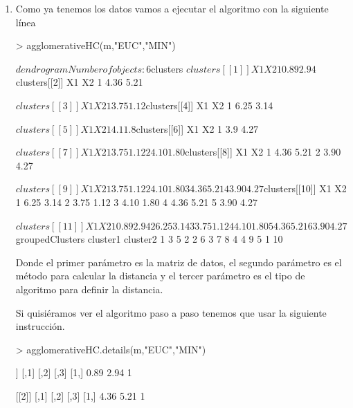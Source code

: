 \documentclass[parskip=full]{scrartcl}
\begin{document}
\begin{enumerate}
    \item Como ya tenemos los datos vamos a ejecutar el algoritmo con la siguiente línea


\begin{Schunk}
\begin{Sinput}
> agglomerativeHC(m,"EUC","MIN")
\end{Sinput}
\begin{Soutput}
$dendrogram
Number of objects: 6 


$clusters
$clusters[[1]]
    X1   X2
1 0.89 2.94

$clusters[[2]]
    X1   X2
1 4.36 5.21

$clusters[[3]]
    X1   X2
1 3.75 1.12

$clusters[[4]]
    X1   X2
1 6.25 3.14

$clusters[[5]]
   X1  X2
1 4.1 1.8

$clusters[[6]]
   X1   X2
1 3.9 4.27

$clusters[[7]]
    X1   X2
1 3.75 1.12
2 4.10 1.80

$clusters[[8]]
    X1   X2
1 4.36 5.21
2 3.90 4.27

$clusters[[9]]
    X1   X2
1 3.75 1.12
2 4.10 1.80
3 4.36 5.21
4 3.90 4.27

$clusters[[10]]
    X1   X2
1 6.25 3.14
2 3.75 1.12
3 4.10 1.80
4 4.36 5.21
5 3.90 4.27

$clusters[[11]]
    X1   X2
1 0.89 2.94
2 6.25 3.14
3 3.75 1.12
4 4.10 1.80
5 4.36 5.21
6 3.90 4.27


$groupedClusters
  cluster1 cluster2
1        3        5
2        2        6
3        7        8
4        4        9
5        1       10
\end{Soutput}
\end{Schunk}


    Donde el primer parámetro es la matriz de datos, el segundo parámetro es el método para calcular la distancia y el tercer parámetro es el tipo de algoritmo para definir la distancia.

    Si quisiéramos ver el algoritmo paso a paso tenemos que usar la siguiente instrucción.


\begin{Schunk}
\begin{Sinput}
> agglomerativeHC.details(m,"EUC","MIN")
\end{Sinput}
\begin{Soutput}
[[1]]
     [,1] [,2] [,3]
[1,] 0.89 2.94    1

[[2]]
     [,1] [,2] [,3]
[1,] 4.36 5.21    1


\end{Soutput}
\end{Schunk}
\end{enumerate}
\end{document}
